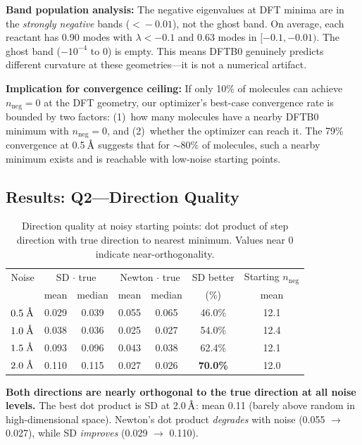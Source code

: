 \documentclass[11pt,a4paper]{article}
\newcommand{\eval}{\lambda}
\newcommand{\angstrom}{\text{\r{A}}}
\begin{document}
\textbf{Band population analysis:} The negative eigenvalues at DFT minima are in the \emph{strongly negative} bands ($<\!-0.01$), not the ghost band. On average, each reactant has 0.90 modes with $\eval < -0.1$ and 0.63 modes in $[-0.1, -0.01)$. The ghost band ($-10^{-4}$ to $0$) is empty. This means DFTB0 genuinely predicts different curvature at these geometries---it is not a numerical artifact.

\textbf{Implication for convergence ceiling:} If only 10\% of molecules can achieve $n_\text{neg} = 0$ at the DFT geometry, our optimizer's best-case convergence rate is bounded by two factors: (1)~how many molecules have a nearby DFTB0 minimum with $n_\text{neg} = 0$, and (2)~whether the optimizer can reach it. The 79\% convergence at 0.5\,$\angstrom$ suggests that for $\sim\!80\%$ of molecules, such a nearby minimum exists and is reachable with low-noise starting points.

\subsection{Results: Q2---Direction Quality}

\begin{table}[H]
\centering
\caption{Direction quality at noisy starting points: dot product of step direction with true direction to nearest minimum. Values near 0 indicate near-orthogonality.}
\label{tab:direction-quality}
\begin{tabular}{rcccccc}
\toprule
Noise & \multicolumn{2}{c}{SD $\cdot$ true} & \multicolumn{2}{c}{Newton $\cdot$ true} & SD better & Starting $n_\text{neg}$ \\
 & mean & median & mean & median & (\%) & mean \\
\midrule
$0.5\;\angstrom$ & 0.029 & 0.039 & 0.055 & 0.065 & 46.0\% & 12.1 \\
$1.0\;\angstrom$ & 0.038 & 0.036 & 0.025 & 0.027 & 54.0\% & 12.4 \\
$1.5\;\angstrom$ & 0.093 & 0.096 & 0.043 & 0.038 & 62.4\% & 12.1 \\
$2.0\;\angstrom$ & 0.110 & 0.115 & 0.027 & 0.026 & \textbf{70.0\%} & 12.0 \\
\bottomrule
\end{tabular}
\end{table}

\textbf{Both directions are nearly orthogonal to the true direction at all noise levels.} The best dot product is SD at 2.0\,$\angstrom$: mean 0.11 (barely above random in high-dimensional space). Newton's dot product \emph{degrades} with noise (0.055 $\to$ 0.027), while SD \emph{improves} (0.029 $\to$ 0.110).
\end{document}
